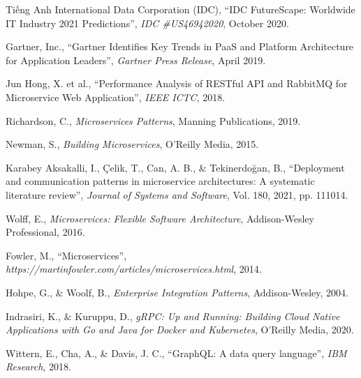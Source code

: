 \documentclass{uetgraduation}
\begin{document}
\begin{thebibliography}{9}

    \begin{bibsection}{Tiếng Anh}
        International Data Corporation (IDC),
        ``IDC FutureScape: Worldwide IT Industry 2021 Predictions'',
        \textit{IDC \#US46942020},
        October 2020.

        Gartner, Inc.,
        ``Gartner Identifies Key Trends in PaaS and Platform Architecture for Application Leaders'',
        \textit{Gartner Press Release},
        April 2019.

        Jun Hong, X. et al.,
        ``Performance Analysis of RESTful API and RabbitMQ for Microservice Web Application'',
        \textit{IEEE ICTC},
        2018.

        Richardson, C.,
        \textit{Microservices Patterns},
        Manning Publications, 2019.

        Newman, S.,
        \textit{Building Microservices},
        O'Reilly Media, 2015.

        Karabey Aksakalli, I., Çelik, T., Can, A. B., \& Tekinerdoğan, B.,
        ``Deployment and communication patterns in microservice architectures: A systematic literature review'',
        \textit{Journal of Systems and Software},
        Vol. 180, 2021, pp. 111014.

        Wolff, E.,
        \textit{Microservices: Flexible Software Architecture},
        Addison-Wesley Professional, 2016.

        Fowler, M.,
        ``Microservices'',
        \textit{https://martinfowler.com/articles/microservices.html},
        2014.

        Hohpe, G., \& Woolf, B.,
        \textit{Enterprise Integration Patterns},
        Addison-Wesley, 2004.

        Indrasiri, K., \& Kuruppu, D.,
        \textit{gRPC: Up and Running: Building Cloud Native Applications with Go and Java for Docker and Kubernetes},
        O'Reilly Media, 2020.

        Wittern, E., Cha, A., \& Davis, J. C.,
        ``GraphQL: A data query language'',
        \textit{IBM Research},
        2018.


\end{bibsection}
\end{thebibliography}
\end{document}
